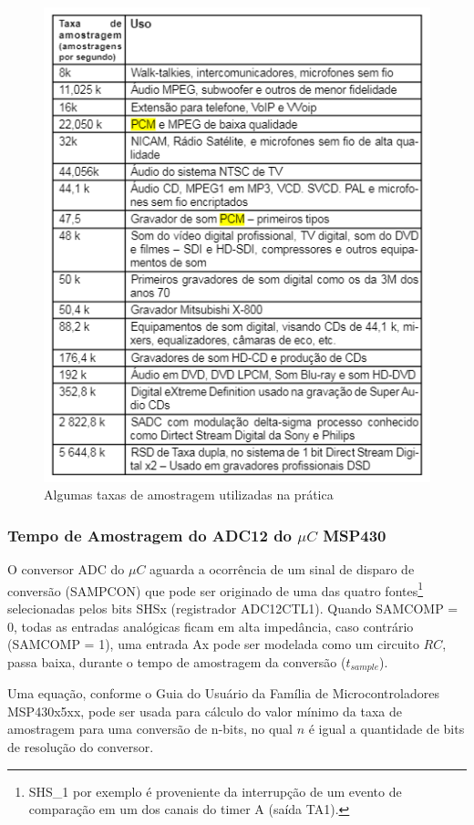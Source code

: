 		\begin{figure}[!ht]
			\label{fig-taxa-de-amostragem-exemplos}
			\centering
			\includegraphics[scale=0.8]{./figuras/fig-exemplo-taxa-amostragem.png}
			\caption{Algumas taxas de amostragem utilizadas na prática}
		\end{figure}
	
		\subsubsection{Tempo de Amostragem do ADC12 do $\mu C$ MSP430}
			
			O conversor ADC do $\mu C$ aguarda a ocorrência de um sinal de disparo de conversão (SAMPCON) que pode ser originado de uma das quatro fontes\footnote{SHS\_1 por exemplo é proveniente da interrupção de um evento de comparação em um dos canais do timer A (saída TA1).} selecionadas pelos bits SHSx (registrador ADC12CTL1). Quando SAMCOMP = 0, todas as entradas analógicas ficam em alta impedância, caso contrário (SAMCOMP = 1), uma entrada Ax pode ser modelada como um circuito $RC$, passa baixa, durante o tempo de amostragem da conversão ($t_{sample}$).
			
			Uma equação, conforme o Guia do Usuário da Família de Microcontroladores MSP430x5xx, pode ser usada para cálculo do valor mínimo da taxa de amostragem para uma conversão de n-bits, no qual $ n $ é igual a quantidade de bits de resolução do conversor.
			
